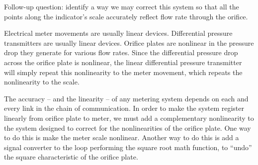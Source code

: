 \vskip 10pt

Follow-up question: identify a way we may correct this system so that all the points along the indicator's scale accurately reflect flow rate through the orifice.







Electrical meter movements are usually linear devices.  Differential pressure transmitters are usually linear devices.  Orifice plates are nonlinear in the pressure drop they generate for various flow rates.  Since the differential pressure drop across the orifice plate is nonlinear, the linear differential pressure transmitter will simply repeat this nonlinearity to the meter movement, which repeats the nonlinearity to the scale.

The accuracy -- and the linearity -- of any metering system depends on each and every link in the chain of communication.  In order to make the system register linearly from orifice plate to meter, we must add a complementary nonlinearity to the system designed to correct for the nonlinearities of the orifice plate.  One way to do this is make the meter scale nonlinear.  Another way to do this is add a signal converter to the loop performing the square root math function, to ``undo'' the square characteristic of the orifice plate.




